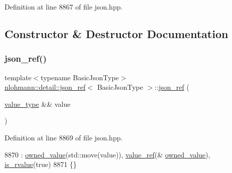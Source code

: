 Definition at line 8867 of file json.\+hpp.



\subsection{Constructor \& Destructor Documentation}
\mbox{\label{classnlohmann_1_1detail_1_1json__ref_ae1adf5bcee8b6fa0c358710604fb1938}} 
\subsubsection{\texorpdfstring{json\+\_\+ref()}{json\_ref()}\hspace{0.1cm}{\footnotesize\ttfamily [1/6]}}
{\footnotesize\ttfamily template$<$typename Basic\+Json\+Type$>$ \\
\hyperlink{classnlohmann_1_1detail_1_1json__ref}{nlohmann\+::detail\+::json\+\_\+ref}$<$ Basic\+Json\+Type $>$\+::\hyperlink{classnlohmann_1_1detail_1_1json__ref}{json\+\_\+ref} (\begin{DoxyParamCaption}\item[{\hyperlink{classnlohmann_1_1detail_1_1json__ref_a78d76cf288141049568c0d670ed670ef}{value\+\_\+type} \&\&}]{value }\end{DoxyParamCaption})\hspace{0.3cm}{\ttfamily [inline]}}



Definition at line 8869 of file json.\+hpp.


\begin{DoxyCode}
8870         : \hyperlink{classnlohmann_1_1detail_1_1json__ref_a5d7bd67a5ab713d9be1e248cf9d509cd}{owned\_value}(std::move(value)), \hyperlink{classnlohmann_1_1detail_1_1json__ref_a23504615c2076070d5e087443bb376a4}{value\_ref}(&
      \hyperlink{classnlohmann_1_1detail_1_1json__ref_a5d7bd67a5ab713d9be1e248cf9d509cd}{owned\_value}), \hyperlink{classnlohmann_1_1detail_1_1json__ref_a434d1e18c21cc1b61954ba22b62ee7a5}{is\_rvalue}(\textcolor{keyword}{true})
8871     \{\}
\end{DoxyCode}
\mbox{\label{classnlohmann_1_1detail_1_1json__ref_a8c3eb3c6e952ed0cd7eece586ab4047c}} 
